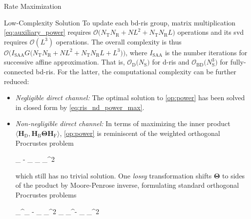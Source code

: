 \documentclass[journal]{IEEEtran}
\begin{document}
\begin{section}{Rate Maximization}
\begin{subsection}{Low-Complexity Solution}
		To update each \gls{bd}-\gls{ris} group, matrix multiplication \eqref{eq:auxiliary_power} requires $\mathcal{O}\bigl(N_\mathrm{T} N_\mathrm{R} + NL^2+N_\mathrm{T} N_\mathrm{R} L\bigr)$ operations and its \gls{svd} requires $\mathcal{O}(L^3)$ operations.
		The overall complexity is thus $\mathcal{O}\bigl(I_\text{SAA} G \bigl(N_\mathrm{T} N_\mathrm{R} + NL^2+N_\mathrm{T} N_\mathrm{R} L + L^3\bigr)\bigr)$, where $I_\text{SAA}$ is the number iterations for successive affine approximation.
		That is, $\mathcal{O}_\mathrm{D}\bigl(N_\mathrm{S}\bigr)$ for \gls{d}-\gls{ris} and $\mathcal{O}_\mathrm{BD}\bigl(N_\mathrm{S}^3\bigr)$ for fully-connected \gls{bd}-\gls{ris}.
		For the latter, the computational complexity can be further reduced:
		\begin{itemize}
			\item \emph{Negligible direct channel:} The optimal solution to \eqref{op:power} has been solved in closed form by \eqref{eq:ris_nd_power_max}.
			\item \emph{Non-negligible direct channel:} In terms of maximizing the inner product $\langle \mathbf{H}_\mathrm{D}, \mathbf{H}_\mathrm{B} \mathbf{\Theta} \mathbf{H}_\mathrm{F} \rangle$, \eqref{op:power} is reminiscent of the weighted orthogonal Procrustes problem \cite{Gower2004}
			\begin{mini!}
				{\scriptstyle{\mathbf{\Theta}}}{\lVert {}_ - _ \mathbf{\Theta} _\mathrm{F} \rVert _^2}{\label{op:procrustes_wt}}{}
			\end{mini!}
			which still has no trivial solution.
			One \emph{lossy} transformation \cite{Bell2003} shifts $\mathbf{\Theta}$ to sides of the product by Moore-Penrose inverse, formulating standard orthogonal Procrustes problems
			\begin{mini!}
				{\scriptstyle{\mathbf{\Theta}}}{\lVert {}_^\dagger {}_ - \mathbf{\Theta} _\mathrm{F} \rVert _^2  \lVert \mathbf{H}_ _^\dagger - _ \mathbf{\Theta} \rVert _^2}{\label{op:procrustes}}{}

\end{mini!}
\end{itemize}
\end{subsection}
\end{section}
\end{document}
